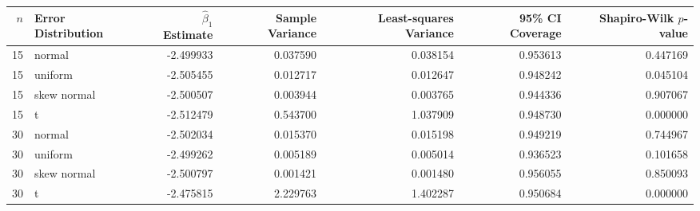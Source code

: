 \begin{tabular}{rlrrrrr}
\toprule
 $n$ & Error Distribution &  $\hat{\beta}_1$ Estimate &  Sample Variance &  Least-squares Variance &  95\% CI Coverage &  Shapiro-Wilk $p$-value \\
\midrule
  15 &             normal &                 -2.499933 &         0.037590 &                0.038154 &         0.953613 &                0.447169 \\
  15 &            uniform &                 -2.505455 &         0.012717 &                0.012647 &         0.948242 &                0.045104 \\
  15 &        skew normal &                 -2.500507 &         0.003944 &                0.003765 &         0.944336 &                0.907067 \\
  15 &                  t &                 -2.512479 &         0.543700 &                1.037909 &         0.948730 &                0.000000 \\
  30 &             normal &                 -2.502034 &         0.015370 &                0.015198 &         0.949219 &                0.744967 \\
  30 &            uniform &                 -2.499262 &         0.005189 &                0.005014 &         0.936523 &                0.101658 \\
  30 &        skew normal &                 -2.500797 &         0.001421 &                0.001480 &         0.956055 &                0.850093 \\
  30 &                  t &                 -2.475815 &         2.229763 &                1.402287 &         0.950684 &                0.000000 \\
\bottomrule
\end{tabular}
